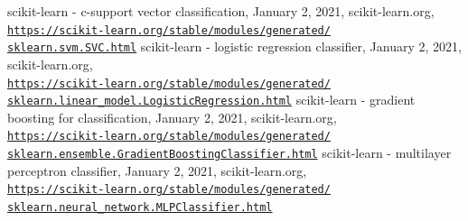 \documentclass[a4paper,12pt,nottoc]{article}
\begin{document}
\begin{thebibliography}{9}
 scikit-learn - c-support vector classification, January 2, 2021, scikit-learn.org, \\\href{https://scikit-learn.org/stable/modules/generated/sklearn.svm.SVC.html}{\texttt{https://scikit-learn.org/stable/modules/generated/\\sklearn.svm.SVC.html}}
 scikit-learn - logistic regression classifier, January 2, 2021, scikit-learn.org, \\\href{https://scikit-learn.org/stable/modules/generated/sklearn.linear_model.LogisticRegression.html}{\texttt{https://scikit-learn.org/stable/modules/generated/\\sklearn.linear\_model.LogisticRegression.html}}
 scikit-learn - gradient boosting for classification, January 2, 2021, scikit-learn.org, \\\href{https://scikit-learn.org/stable/modules/generated/sklearn.ensemble.GradientBoostingClassifier.html}{\texttt{https://scikit-learn.org/stable/modules/generated/\\sklearn.ensemble.GradientBoostingClassifier.html}}
 scikit-learn - multilayer perceptron classifier, January 2, 2021, scikit-learn.org, \\\href{https://scikit-learn.org/stable/modules/generated/sklearn.neural_network.MLPClassifier.html}{\texttt{https://scikit-learn.org/stable/modules/generated/\\sklearn.neural\_network.MLPClassifier.html}}
\end{thebibliography}
\end{document}
